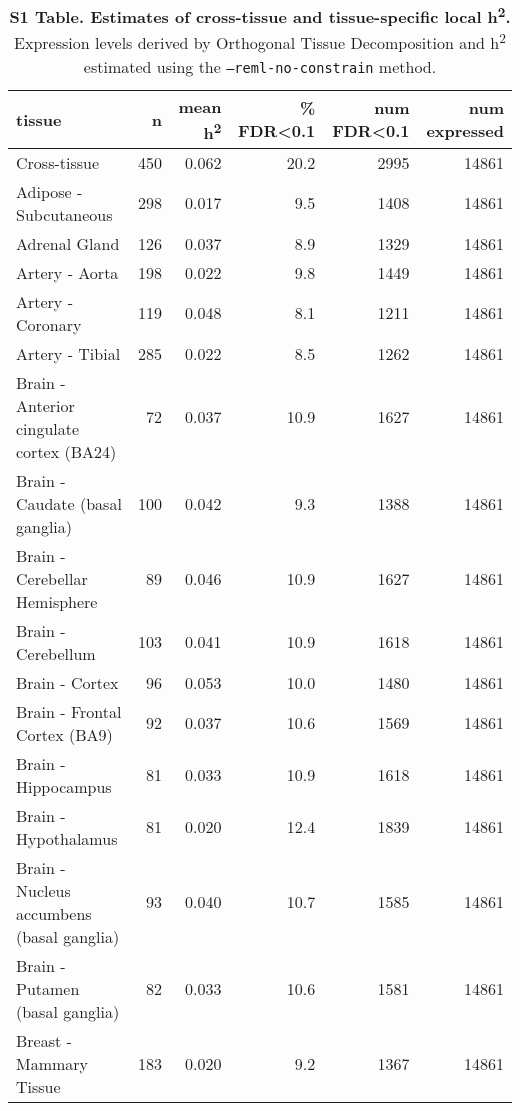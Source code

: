 \documentclass[10pt,letterpaper]{article}
\date{}
\begin{document}
\vspace*{0.35in}


\begin{table}[!ht]
\begin{adjustwidth}{-2.25in}{0in} %
\caption*{{\bf S1 Table. Estimates of cross-tissue and tissue-specific local h\textsuperscript{2}.} Expression levels derived by Orthogonal Tissue Decomposition and h\textsuperscript{2} estimated using the \texttt{--reml-no-constrain} method.}
\centering
\begin{tabular}{lrrrrr}
  \hline
tissue & n & mean h\textsuperscript{2} & \% FDR\textless{}0.1 & num FDR\textless{}0.1 & num expressed \\ 
  \hline
Cross-tissue & 450 & 0.062 & 20.2 & 2995 & 14861 \\ 
  Adipose - Subcutaneous & 298 & 0.017 & 9.5 & 1408 & 14861 \\ 
  Adrenal Gland & 126 & 0.037 & 8.9 & 1329 & 14861 \\ 
  Artery - Aorta & 198 & 0.022 & 9.8 & 1449 & 14861 \\ 
  Artery - Coronary & 119 & 0.048 & 8.1 & 1211 & 14861 \\ 
  Artery - Tibial & 285 & 0.022 & 8.5 & 1262 & 14861 \\ 
  Brain - Anterior cingulate cortex (BA24) & 72 & 0.037 & 10.9 & 1627 & 14861 \\ 
  Brain - Caudate (basal ganglia) & 100 & 0.042 & 9.3 & 1388 & 14861 \\ 
  Brain - Cerebellar Hemisphere & 89 & 0.046 & 10.9 & 1627 & 14861 \\ 
  Brain - Cerebellum & 103 & 0.041 & 10.9 & 1618 & 14861 \\ 
  Brain - Cortex & 96 & 0.053 & 10.0 & 1480 & 14861 \\ 
  Brain - Frontal Cortex (BA9) & 92 & 0.037 & 10.6 & 1569 & 14861 \\ 
  Brain - Hippocampus & 81 & 0.033 & 10.9 & 1618 & 14861 \\ 
  Brain - Hypothalamus & 81 & 0.020 & 12.4 & 1839 & 14861 \\ 
  Brain - Nucleus accumbens (basal ganglia) & 93 & 0.040 & 10.7 & 1585 & 14861 \\ 
  Brain - Putamen (basal ganglia) & 82 & 0.033 & 10.6 & 1581 & 14861 \\ 
  Breast - Mammary Tissue & 183 & 0.020 & 9.2 & 1367 & 14861 \\ 

\end{tabular}
\end{adjustwidth}
\end{table}
\end{document}
